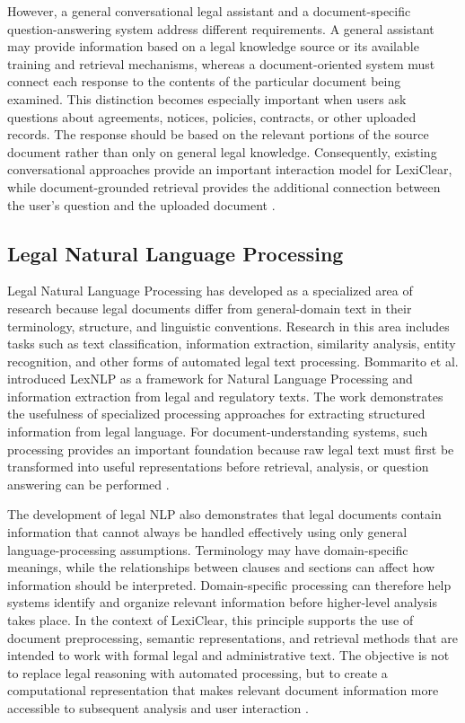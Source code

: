 \documentclass[12pt,a4paper,oneside]{report}
\begin{document}
However, a general conversational legal assistant and a document-specific
question-answering system address different requirements. A general assistant
may provide information based on a legal knowledge source or its available
training and retrieval mechanisms, whereas a document-oriented system must
connect each response to the contents of the particular document being
examined. This distinction becomes especially important when users ask
questions about agreements, notices, policies, contracts, or other uploaded
records. The response should be based on the relevant portions of the source
document rather than only on general legal knowledge. Consequently, existing
conversational approaches provide an important interaction model for
LexiClear, while document-grounded retrieval provides the additional
connection between the user's question and the uploaded document
\cite{kandula2023,dutta2024,muthuraju2025}.

\subsection{Legal Natural Language Processing}

Legal Natural Language Processing has developed as a specialized area of
research because legal documents differ from general-domain text in their
terminology, structure, and linguistic conventions. Research in this area
includes tasks such as text classification, information extraction,
similarity analysis, entity recognition, and other forms of automated legal
text processing. Bommarito et al. introduced LexNLP as a framework for
Natural Language Processing and information extraction from legal and
regulatory texts. The work demonstrates the usefulness of specialized
processing approaches for extracting structured information from legal
language.
For document-understanding systems, such processing provides an important
foundation because raw legal text must first be transformed into useful
representations before retrieval, analysis, or question answering can be
performed
\cite{bommarito2018lexnlp}.

The development of legal NLP also demonstrates that legal documents contain
information that cannot always be handled effectively using only general
language-processing assumptions. Terminology may have domain-specific
meanings, while the relationships between clauses and sections can affect how
information should be interpreted. Domain-specific processing can therefore
help systems identify and organize relevant information before higher-level
analysis takes place. In the context of LexiClear, this principle supports
the use of document preprocessing, semantic representations, and retrieval
methods that are intended to work with formal legal and administrative text.
The objective is not to replace legal reasoning with automated processing, but
to create a computational representation that makes relevant document
information more accessible to subsequent analysis and user interaction
\cite{bommarito2018lexnlp}.
\end{document}
